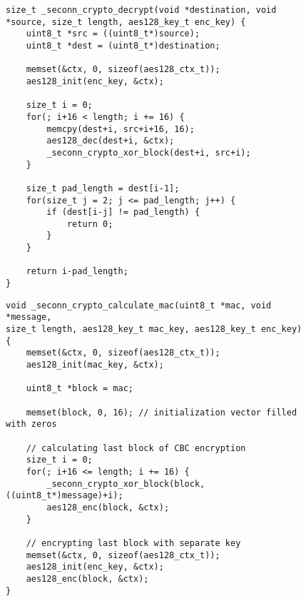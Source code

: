 \begin{figure}
\begin{lstlisting}[caption={Odszyfrowanie CBC wraz z obsługą dopełnienia PKCS\#7},label={lst:decrypt}]
size_t _seconn_crypto_decrypt(void *destination, void *source, size_t length, aes128_key_t enc_key) {
    uint8_t *src = ((uint8_t*)source);
    uint8_t *dest = (uint8_t*)destination;

    memset(&ctx, 0, sizeof(aes128_ctx_t));
    aes128_init(enc_key, &ctx);

    size_t i = 0;
    for(; i+16 < length; i += 16) {
        memcpy(dest+i, src+i+16, 16);
        aes128_dec(dest+i, &ctx);
        _seconn_crypto_xor_block(dest+i, src+i);
    }

    size_t pad_length = dest[i-1];
    for(size_t j = 2; j <= pad_length; j++) {
        if (dest[i-j] != pad_length) {
            return 0;
        }
    }

    return i-pad_length;
}
\end{lstlisting}
\end{figure}

\begin{figure}
\begin{lstlisting}[caption={Obliczanie MAC dla wiadomości},label={lst:mac}]
void _seconn_crypto_calculate_mac(uint8_t *mac, void *message,
size_t length, aes128_key_t mac_key, aes128_key_t enc_key) {
    memset(&ctx, 0, sizeof(aes128_ctx_t));
    aes128_init(mac_key, &ctx);

    uint8_t *block = mac;

    memset(block, 0, 16); // initialization vector filled with zeros

    // calculating last block of CBC encryption
    size_t i = 0;
    for(; i+16 <= length; i += 16) {
        _seconn_crypto_xor_block(block, ((uint8_t*)message)+i);
        aes128_enc(block, &ctx);
    }

    // encrypting last block with separate key
    memset(&ctx, 0, sizeof(aes128_ctx_t));
    aes128_init(enc_key, &ctx);
    aes128_enc(block, &ctx);
}
\end{lstlisting}
\end{figure}
